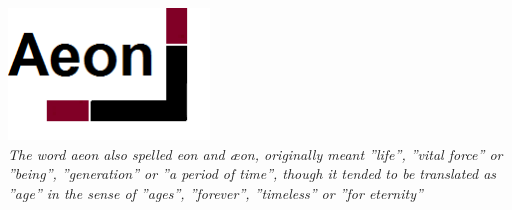 \vspace*{\fill}

\begin{minipage}{.85\linewidth}
\begin{center}

	\includegraphics[width=0.4\textwidth]{../Templates/Aeonbig.png}\\[2cm]
	
\emph{The word aeon also spelled eon and æon, originally meant ''life'', ''vital force'' or ''being'', ''generation'' or ''a period of time'', though it tended to be translated as ''age'' in the sense of ''ages'', ''forever'', ''timeless'' or ''for eternity''} %

\end{center}
\end{minipage}
\vspace*{\fill}

\clearpage
